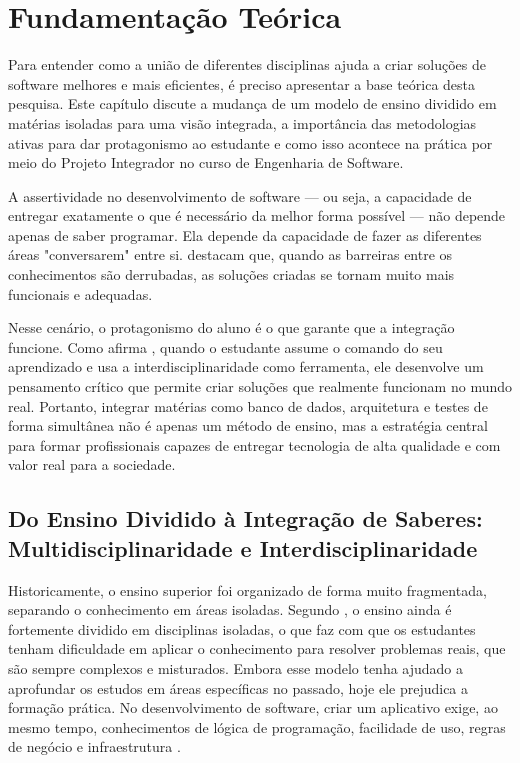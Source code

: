 \chapter{Fundamentação Teórica}
\label{cap:fundamentacao-teorica}

Para entender como a união de diferentes disciplinas ajuda a criar soluções de
software melhores e mais eficientes, é preciso apresentar a base teórica desta
pesquisa. Este capítulo discute a mudança de um modelo de ensino dividido em
matérias isoladas para uma visão integrada, a importância das metodologias
ativas para dar protagonismo ao estudante e como isso acontece na prática por
meio do Projeto Integrador no curso de Engenharia de Software.

A assertividade no desenvolvimento de software — ou seja, a capacidade de
entregar exatamente o que é necessário da melhor forma possível — não depende
apenas de saber programar. Ela depende da capacidade de fazer as diferentes
áreas "conversarem" entre si.  destacam que,
quando as barreiras entre os conhecimentos são derrubadas, as soluções criadas
se tornam muito mais funcionais e adequadas.

Nesse cenário, o protagonismo do aluno é o que garante que a integração
funcione. Como afirma , quando o
estudante assume o comando do seu aprendizado e usa a interdisciplinaridade
como ferramenta, ele desenvolve um pensamento crítico que permite criar
soluções que realmente funcionam no mundo real. Portanto, integrar matérias
como banco de dados, arquitetura e testes de forma simultânea não é apenas um
método de ensino, mas a estratégia central para formar profissionais capazes de
entregar tecnologia de alta qualidade e com valor real para a sociedade.

\section{Do Ensino Dividido à Integração de Saberes: Multidisciplinaridade e Interdisciplinaridade}\label{sec:do-ensino-dividido}

Historicamente, o ensino superior foi organizado de forma muito fragmentada,
separando o conhecimento em áreas isoladas. Segundo
, o ensino ainda é fortemente
dividido em disciplinas isoladas, o que faz com que os estudantes tenham
dificuldade em aplicar o conhecimento para resolver problemas reais, que são
sempre complexos e misturados. Embora esse modelo tenha ajudado a aprofundar os
estudos em áreas específicas no passado, hoje ele prejudica a formação prática.
No desenvolvimento de software, criar um aplicativo exige, ao mesmo tempo,
conhecimentos de lógica de programação, facilidade de uso, regras de negócio e
infraestrutura \cite{paulista2018desenvolvimento}.

